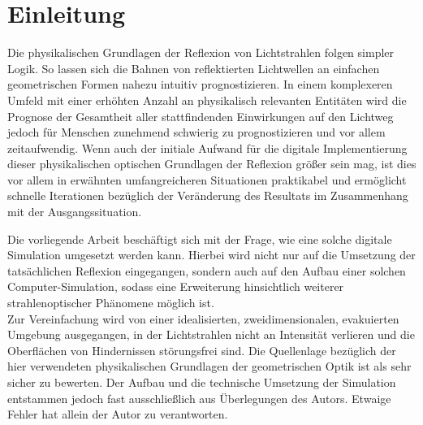 \chapter{Einleitung}
Die physikalischen Grundlagen der Reflexion von Lichtstrahlen folgen simpler Logik. 
So lassen sich die Bahnen von reflektierten Lichtwellen an einfachen 
geometrischen Formen nahezu intuitiv prognostizieren.
In einem komplexeren Umfeld mit einer erhöhten Anzahl an 
physikalisch relevanten Entitäten wird die Prognose 
der Gesamtheit aller stattfindenden Einwirkungen auf den 
Lichtweg jedoch für Menschen zunehmend schwierig 
zu prognostizieren und vor allem zeitaufwendig.
Wenn auch der initiale Aufwand für die digitale Implementierung dieser physikalischen 
optischen Grundlagen der Reflexion größer sein mag, 
ist dies vor allem in erwähnten umfangreicheren Situationen praktikabel und ermöglicht 
schnelle Iterationen bezüglich der Veränderung 
des Resultats im Zusammenhang mit der Ausgangssituation. 

Die vorliegende Arbeit beschäftigt sich mit der Frage, 
wie eine solche digitale Simulation umgesetzt werden kann. 
Hierbei wird nicht nur auf die Umsetzung der tatsächlichen 
Reflexion eingegangen, sondern auch auf 
den Aufbau einer solchen Computer-Simulation, 
sodass eine Erweiterung hinsichtlich weiterer strahlenoptischer 
Phänomene möglich ist. \\ 
Zur Vereinfachung wird von einer idealisierten, zweidimensionalen, 
evakuierten Umgebung ausgegangen, 
in der Lichtstrahlen nicht an Intensität verlieren
und die Oberflächen von Hindernissen störungsfrei sind.
\newpage
Die Quellenlage bezüglich der hier verwendeten physikalischen Grundlagen der geometrischen Optik ist als sehr sicher zu bewerten. 
Der Aufbau und die technische Umsetzung der Simulation entstammen jedoch fast ausschließlich aus Überlegungen des Autors.
Etwaige Fehler hat allein der Autor zu verantworten.